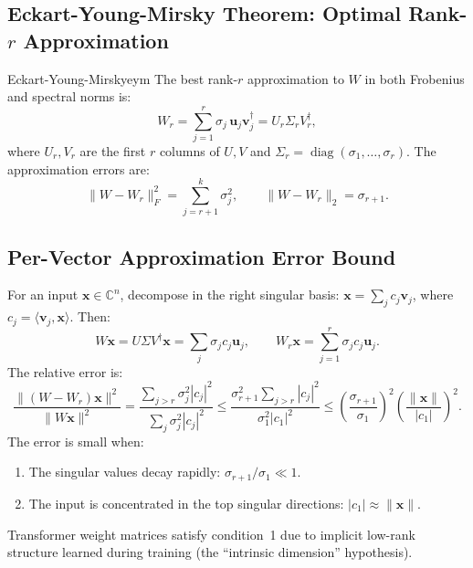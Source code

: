 \documentclass[12pt, a4paper]{article}
\newcommand{\CC}{\mathbb{C}}
\newcommand{\diag}{\operatorname{diag}}
\begin{document}
\subsection{Eckart-Young-Mirsky Theorem: Optimal Rank-$r$ Approximation}

\begin{theorem}{Eckart-Young-Mirsky}{eym}
  The best rank-$r$ approximation to $W$ in both Frobenius and spectral norms is:
  \begin{equation}
    W_r = \sum_{j=1}^r \sigma_j\,\mathbf{u}_j\mathbf{v}_j^\dagger
          = U_r\Sigma_r V_r^\dagger,
    \label{eq:Wr}
  \end{equation}
  where $U_r,V_r$ are the first $r$ columns of $U,V$ and
  $\Sigma_r=\diag(\sigma_1,\ldots,\sigma_r)$.
  The approximation errors are:
  \begin{equation}
    \|W - W_r\|_F^2 = \sum_{j=r+1}^k \sigma_j^2, \qquad
    \|W - W_r\|_2  = \sigma_{r+1}.
    \label{eq:eym_errors}
  \end{equation}
\end{theorem}

\subsection{Per-Vector Approximation Error Bound}

For an input $\mathbf{x}\in\CC^n$, decompose in the right singular basis:
$\mathbf{x} = \sum_j c_j \mathbf{v}_j$, where $c_j = \langle\mathbf{v}_j,\mathbf{x}\rangle$.
Then:
\begin{equation}
  W\mathbf{x} = U\Sigma V^\dagger\mathbf{x} = \sum_j \sigma_j c_j \mathbf{u}_j,
  \qquad
  W_r\mathbf{x} = \sum_{j=1}^r \sigma_j c_j \mathbf{u}_j.
\end{equation}
The relative error is:
\begin{equation}
  \frac{\|(W-W_r)\mathbf{x}\|^2}{\|W\mathbf{x}\|^2}
  = \frac{\sum_{j>r}\sigma_j^2|c_j|^2}{\sum_j\sigma_j^2|c_j|^2}
  \leq \frac{\sigma_{r+1}^2\sum_{j>r}|c_j|^2}{\sigma_1^2|c_1|^2}
  \leq \left(\frac{\sigma_{r+1}}{\sigma_1}\right)^2
       \left(\frac{\|\mathbf{x}\|}{|c_1|}\right)^2.
  \label{eq:per_vector_error}
\end{equation}
The error is small when:
\begin{enumerate}
  \item The singular values decay rapidly: $\sigma_{r+1}/\sigma_1 \ll 1$.
  \item The input is concentrated in the top singular directions: $|c_1|\approx\|\mathbf{x}\|$.
\end{enumerate}
Transformer weight matrices satisfy condition~1 due to implicit low-rank
structure learned during training (the ``intrinsic dimension'' hypothesis).
\end{document}
